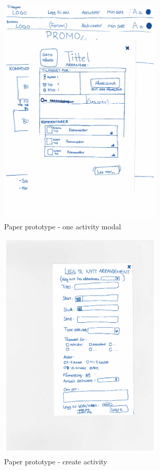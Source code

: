\begin{figure}[H]
\centering
     \includegraphics[width=0.7\textwidth]{fig/PaperPrototype/One_activity.pdf}
\caption{Paper prototype - one activity modal}
\label{One_Activity_PP}
\end{figure}

\begin{figure}[H]
\centering
     \includegraphics[width=0.7\textwidth]{fig/PaperPrototype/Create_activity.pdf}
\caption{Paper prototype - create activity}
\label{Create_Activity}
\end{figure}


